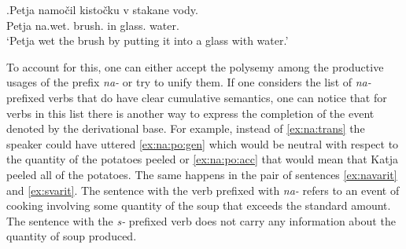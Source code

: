 \exg.\label{ex:namochit}Petja namo\v{c}il kisto\v{c}ku v stakane vody.\\
Petja na.wet. brush. in glass. water.\\
\trans `Petja wet the brush by putting it into a glass with water.'

%
%

To account for this, one can either accept the polysemy among the productive usages of the prefix \textit{na-}   or try to unify them. If one considers the list of \textit{na-}  prefixed verbs that do have clear cumulative  semantics, one can notice that for verbs in this list there is another way to express the completion of the event denoted by the derivational base. For example, instead of \ref{ex:na:trans} the speaker could have uttered \ref{ex:na:po:gen} which would be neutral with respect to the quantity of the potatoes peeled or \ref{ex:na:po:acc} that would mean that Katja peeled all of the potatoes. The same happens in the pair of sentences \ref{ex:navarit} and \ref{ex:svarit}. The sentence with the verb prefixed with \textit{na-}   refers to an event of cooking involving some quantity of the soup that exceeds the standard amount. The sentence with the \textit{s-}  prefixed verb does not carry any information about the quantity of soup produced.

